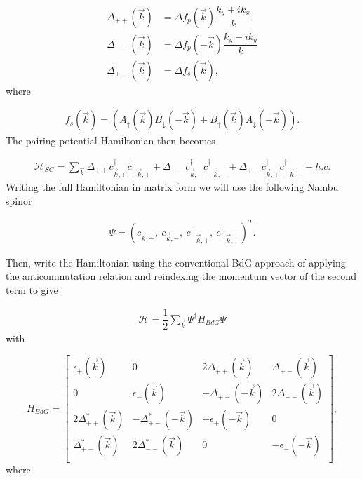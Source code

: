 \begin{align}
  \Delta_{++}(\vec{k}) &= \Delta f_p(\vec{k}) \dfrac{k_y +i k_x}{k} \\
  \Delta_{--}(\vec{k}) &= \Delta f_p(-\vec{k}) \dfrac{k_y -i k_y}{k} \\
  \Delta_{+-}(\vec{k}) &= \Delta f_s(\vec{k}),
\end{align}
where

\begin{align}
  f_s(\vec{k}) = \left(A_{\uparrow}(\vec{k})B_{\downarrow}(-\vec{k})+B_{\uparrow}(\vec{k})A_{\downarrow}(-\vec{k})\right).
\end{align}
The pairing potential Hamiltonian then becomes

\begin{align}
  \mathcal{H}_{SC} = \sum_{\vec{k}} \Delta_{++}c_{\vec{k},+}^{\dagger}c_{-\vec{k},+}^{\dagger} + \Delta_{--}c_{\vec{k},-}^{\dagger}c_{-\vec{k},-}^{\dagger} +\Delta_{+-}c_{\vec{k},+}^{\dagger}c_{-\vec{k},-}^{\dagger} + h.c.
\end{align}
Writing the full Hamiltonian in matrix form we will use the following Nambu spinor

\begin{align}
  \Psi = (c_{\vec{k},+},\ c_{\vec{k},-},\ c_{-\vec{k},+}^{\dagger},\ c_{-\vec{k},-}^{\dagger} )^T.
\end{align}

Then, write the Hamiltonian using the conventional BdG approach of applying the anticommutation relation and reindexing the momentum vector of the second term to give

\begin{align}
  \mathcal{H} = \dfrac{1}{2}\sum_{\vec{k}} \Psi^{\dagger}H_{BdG}\Psi
\end{align}
with

\begin{equation}
  H_{BdG} =
  \begin{bmatrix}
    \epsilon_+(\vec{k}) & 0 & 2\Delta_{++}(\vec{k}) & \Delta_{+-}(\vec{k}) \\
    0 & \epsilon_-(\vec{k}) & -\Delta_{+-}(-\vec{k}) & 2\Delta_{--}(\vec{k}) \\
    2\Delta_{++}^*(\vec{k}) & -\Delta_{+-}^*(-\vec{k}) & -\epsilon_+(-\vec{k}) & 0 \\
    \Delta_{+-}^*(\vec{k}) & 2\Delta_{--}^*(\vec{k}) & 0 & -\epsilon_-(-\vec{k}) \\
  \end{bmatrix},
\end{equation}
where

